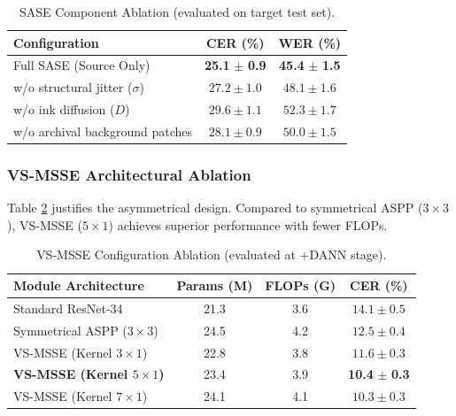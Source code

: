 \documentclass[pdflatex,sn-mathphys-num]{sn-jnl}
\begin{document}
\begin{table}[htbp]
\centering
\caption{SASE Component Ablation (evaluated on target test set).}
\label{tab:sase_ablation}
\begin{tabular}{l c c}
\toprule
\textbf{Configuration} & \textbf{CER (\%)} & \textbf{WER (\%)} \\
\midrule
Full SASE (Source Only) & \textbf{25.1} $\pm$ \textbf{0.9} & \textbf{45.4} $\pm$ \textbf{1.5} \\
\midrule
w/o structural jitter ($\sigma$) & $27.2 \pm 1.0$ & $48.1 \pm 1.6$ \\
w/o ink diffusion ($D$) & $29.6 \pm 1.1$ & $52.3 \pm 1.7$ \\
w/o archival background patches & $28.1 \pm 0.9$ & $50.0 \pm 1.5$ \\
\bottomrule
\end{tabular}
\end{table}

\subsubsection{VS-MSSE Architectural Ablation}
Table \ref{tab:msse_ablation} justifies the asymmetrical design. Compared to symmetrical ASPP ($3\times3$), VS-MSSE ($5\times1$) achieves superior performance with fewer FLOPs. 

\begin{table}[htbp]
\centering
\caption{VS-MSSE Configuration Ablation (evaluated at +DANN stage).}
\label{tab:msse_ablation}
\begin{tabular}{l c c c}
\toprule
\textbf{Module Architecture} & \textbf{Params (M)} & \textbf{FLOPs (G)} & \textbf{CER (\%)} \\
\midrule
Standard ResNet-34 & 21.3 & 3.6 & $14.1 \pm 0.5$ \\
Symmetrical ASPP ($3\times3$) & 24.5 & 4.2 & $12.5 \pm 0.4$ \\
VS-MSSE (Kernel $3\times1$) & 22.8 & 3.8 & $11.6 \pm 0.3$ \\
\textbf{VS-MSSE (Kernel $5\times1$)} & 23.4 & 3.9 & \textbf{10.4} $\pm$ \textbf{0.3} \\
VS-MSSE (Kernel $7\times1$) & 24.1 & 4.1 & $10.3 \pm 0.3$ \\
\bottomrule
\end{tabular}
\end{table}
\end{document}
